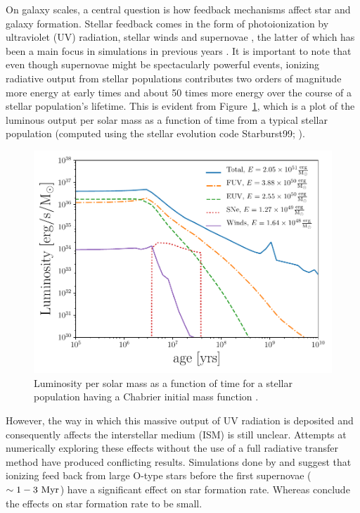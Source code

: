 \documentclass[fleq,usenatbib]{mnras}
\begin{document}
On galaxy scales, a central question is how feedback mechanisms affect star 
and galaxy formation. Stellar feedback comes in the form of photoionization by 
ultraviolet (UV) radiation, stellar winds and supernovae 
\citep[e.g.][]{leithererEt99}, the latter of which has been a main focus in 
simulations in previous years \citep[e.g.][]{agertzEt13}. It is important to 
note that even though supernovae might be spectacularly powerful events, 
ionizing radiative output from stellar populations contributes two orders of 
magnitude more energy at early times and about 50 times more energy over the 
course of a stellar population's lifetime. This is evident from 
Figure~\ref{fig:uvsn}, which is a plot of the luminous output per solar mass 
as a function of time from a typical stellar population (computed using the 
stellar evolution code Starburst99; \citealt{leithererEt99}).
\begin{figure}
\includegraphics[width=1\linewidth]{Figures/uvsn.pdf}
\caption{Luminosity per solar mass as a function of time for a stellar 
population having a Chabrier initial mass function \citep{chabrier03}.}
\label{fig:uvsn}
\end{figure}

However, the way in which this massive output of UV radiation is deposited 
and consequently affects the interstellar medium (ISM) is still unclear. 
Attempts at numerically exploring these effects without the use of a full 
radiative transfer method have produced conflicting results. Simulations done
by \cite{gritschnederEt09} and \cite{walchEt12} suggest that ionizing feed 
back from large O-type stars before the first supernovae ($\sim 1-3\ \rm{Myr}$) 
have a significant effect on star formation rate. Whereas \cite{daleEt12} 
conclude the effects on star formation rate to be small.
\end{document}

